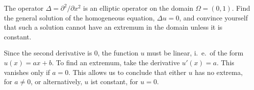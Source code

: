 The operator $\Delta = \partial^2/\partial x^2$ is an elliptic operator on the
domain $\Omega = (0,1)$.
Find the general solution of the homogeneous equation, $\Delta u=0$,
and convince yourself that such a solution cannot have an extremum
in the domain unless it is constant.

\begin{loesung}
Since the second derivative is $0$, the function $u$ must be linear,
i.~e.~of the form $u(x)=ax+b$.
To find an extremum, take the derivative $u'(x)=a$.
This vanishes only if $a=0$.
This allows us to conclude that either $u$ has no extrema, for $a\ne 0$,
or alternatively, $u$ ist constant, for $u=0$.
\end{loesung}

